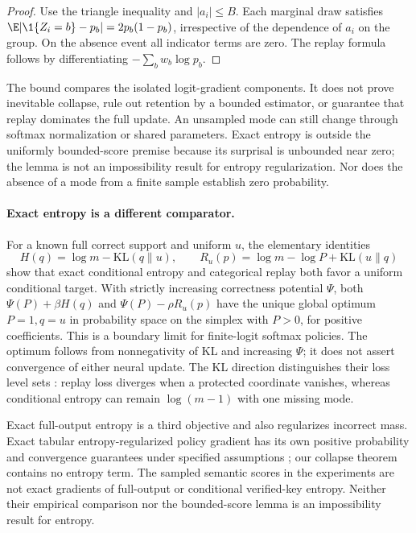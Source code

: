 \begin{proof}
\enforcehalffinalproseline
Use the triangle inequality and $|a_i|\le B$. Each marginal draw satisfies
$\E|\1\{Z_i=b\}-p_b|=2p_b(1-p_b)$, irrespective of the dependence of
$a_i$ on the group. On the absence event all indicator terms are zero.
The replay formula follows by differentiating $-\sum_b w_b\log p_b$.
\end{proof}

The bound compares the isolated logit-gradient components. It does not prove
inevitable collapse, rule out retention by a bounded estimator, or guarantee
that replay dominates the full update. An unsampled mode can still change
through softmax normalization or shared parameters. Exact entropy is outside
the uniformly bounded-score premise because its surprisal is unbounded near
zero; the lemma is not an impossibility result for entropy regularization.
Nor does the absence of a mode from a finite sample establish zero probability.

\paragraph{Exact entropy is a different comparator.}
For a known full correct support and uniform $u$, the elementary identities
\[
 H(q)=\log m-\mathrm{KL}(q\|u),\qquad
 R_u(p)=\log m-\log P+\mathrm{KL}(u\|q)
\]
show that exact conditional entropy and categorical replay both favor a
uniform conditional target. With strictly increasing correctness potential
$\Psi$, both $\Psi(P)+\beta H(q)$ and $\Psi(P)-\rho R_u(p)$ have the unique
global optimum $P=1,q=u$ in probability space on the simplex with $P>0$,
for positive coefficients. This is a boundary limit for finite-logit softmax
policies. The optimum follows from nonnegativity of KL and increasing
$\Psi$; it does not assert convergence of either neural update. The KL direction distinguishes their
loss level sets \citep{pereyra2017confidencepenalty,agarwal2021policygradient}:
replay loss diverges when a protected coordinate vanishes, whereas
conditional entropy can remain $\log(m-1)$ with one missing mode.

Exact full-output entropy is a third objective and also regularizes incorrect
mass. Exact tabular entropy-regularized policy gradient has its own positive
probability and convergence guarantees under specified assumptions
\citep{mei2020softmaxpg}; our collapse theorem contains no entropy term.
The sampled semantic scores in the experiments are not exact gradients of
full-output or conditional verified-key entropy. Neither their empirical
comparison nor the bounded-score lemma is an impossibility result for entropy.

